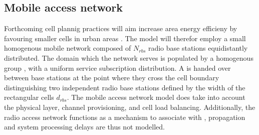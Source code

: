 \subsection{Mobile access network}
Forthcoming cell plannig practices will aim increase area energy efficieny by favouring smaller cells in urban areas \cite{shahab2013framework,5360741}. The model will therefor employ a small homogenous mobile network composed of $N_{rbs}$ radio base stations equidistantly distributed. The domain which the network serves is populated by a homogenous group \ues, with a uniform service subscription distribution. A \ue{} is handed over between base stations at the point where they cross the cell boundary distinguishing two independent radio base stations defined by the width of the rectangular cells $d_{rbs}$. The mobile access network model does take into account the physical layer, channel provisioning, and cell load balancing. Additionally, the radio access network functions as a mechanism to associate \ues{} with \dcs{}, propagation and system processing delays are thus not modelled.